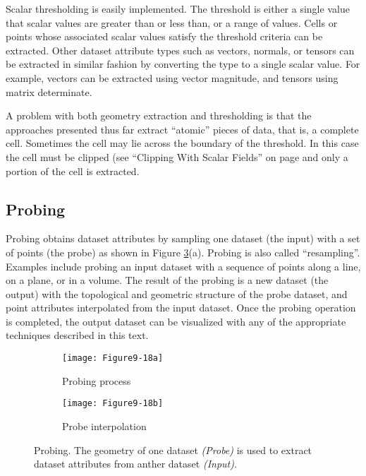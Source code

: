 Scalar thresholding is easily implemented. The threshold is either a single value that scalar values are greater than or less than, or a range of values. Cells or points whose associated scalar values satisfy the threshold criteria can be extracted. Other dataset attribute types such as vectors, normals, or tensors can be extracted in similar fashion by converting the type to a single scalar value. For example, vectors can be extracted using vector magnitude, and tensors using matrix determinate.

A problem with both geometry extraction and thresholding is that the approaches presented thus far extract ``atomic'' pieces of data, that is, a complete cell. Sometimes the cell may lie across the boundary of the threshold. In this case the cell must be clipped (see ``Clipping With Scalar Fields'' on page \pageref{subsec:clipping_with_scalar_fields} and only a portion of the cell is extracted.

\subsection{Probing}
\label{subsec:probing}

Probing obtains dataset attributes by sampling one dataset (the input) with a set of points (the probe) as shown in Figure \ref{fig:Figure9-18}(a). Probing is also called ``resampling''. Examples include probing an input dataset with a sequence of points along a line, on a plane, or in a volume. The result of the probing is a new dataset (the output) with the topological and geometric structure of the probe dataset, and point attributes interpolated from the input dataset. Once the probing operation is completed, the output dataset can be visualized with any of the appropriate techniques described in this text.

\begin{figure}[htb]
	\begin{subfigure}[h]{0.48\linewidth}
		\texttt{[image: Figure9-18a]}
		\captionsetup{justification=centering}
		\caption{Probing process}
		\label{fig:Figure9-18a}
	\end{subfigure}
	\hfill
	\begin{subfigure}[h]{0.48\linewidth}
		\texttt{[image: Figure9-18b]}
		\captionsetup{justification=centering}
		\caption{Probe interpolation}
		\label{fig:Figure9-18b}
	\end{subfigure}
	\caption{Probing. The geometry of one dataset \textit{(Probe)} is used to extract dataset attributes from anther dataset \textit{(Input)}.}\label{fig:Figure9-18}
\end{figure}

